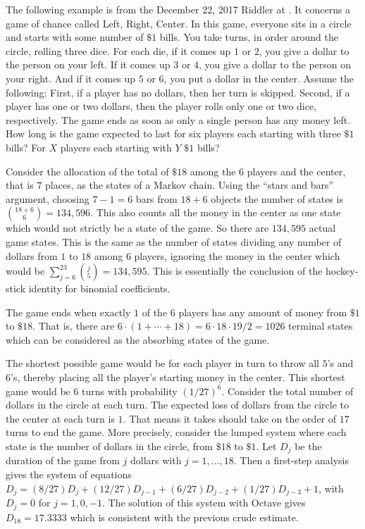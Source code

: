 \begin{example}
  The following example is from the December 22, 2017 Riddler at
  .
  It concerns a game of chance called Left, Right, Center. In this
  game, everyone sits in a circle and starts with some number of $\$1$
  bills. You take turns, in order around the circle, rolling three
  dice. For each die, if it comes up $1$ or $2$, you give a dollar to
  the person on your left. If it comes up $3$ or $4$, you give a
  dollar to the person on your right. And if it comes up $5$ or $6$,
  you put a dollar in the center.  Assume the following: First, if a
  player has no dollars, then her turn is skipped. Second, if a player
  has one or two dollars, then the player rolls only one or two dice,
  respectively. The game ends as soon as only a single person has any
  money left. How long is the game expected to last for six players
  each starting with three $\$1$ bills? For $X$ players each starting
  with $Y$ $\$1$ bills?

  Consider the allocation of the total of $\$18$ among the $6$ players
  and the center, that is $7$ places, as the states of a Markov
  chain.  Using the ``stars and bars'' argument, choosing $7-1 = 6$ bars
  from $18 + 6$ objects the number of states is
  $\binom{18+6}{6} = 134{,}596$.  This also counts all the money in the
  center as one state which would not strictly be a state of the
  game.  So there are $134{,}595$ actual game states.  This is the same as the number of
  states dividing any number of dollars from $1$ to $18$ among $6$
  players, ignoring the money in the center which would be
  $\sum\limits_{j=6}^{23}\binom{j}{5} = 134{,}595$.  This is essentially the
  conclusion of the hockey-stick identity for binomial coefficients.

  The game ends when exactly $1$ of the $6$ players has any amount of
  money from $\$1$ to $\$18$.  That is, there are $6 \cdot (1 + \cdots
  + 18) = 6 \cdot 18 \cdot 19/2 = 1026$ terminal states which can be
  considered as the absorbing states of the game.

  The shortest possible game would be for each player in turn to throw
  all $5$'s and $6$'s, thereby placing all the player's starting money
  in the center.  This shortest game would be $6$ turns with
  probability $(1/27)^6$.  Consider the
  total number of dollars in the circle at each turn.  The expected
  loss of dollars from the circle to the center at each turn is $1$.
  That means it takes should take on the order of $17$ turns to end
  the game.  More precisely, consider the lumped system where each
  state is the number of dollars in the circle, from $\$18$ to $\$1$.
  Let $D_j$ be the duration of the game from $j$ dollars with
  $j = 1, \dots, 18$.  Then a first-step analysis gives the system of
  equations $D_j = (8/27)D_j + (12/27)D_{j-1} + (6/27)D_{j-2} +
  (1/27)D_{j-3} + 1$, with $D_j = 0$ for $j = 1, 0, -1$.  The solution
  of this system with Octave gives $D_{18} = 17.3333$ which is
  consistent with the previous crude estimate.


\end{example}
